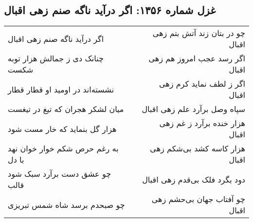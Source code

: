 \begin{center}
\section*{غزل شماره ۱۳۵۶: اگر درآید ناگه صنم زهی اقبال}
\label{sec:1356}
\begin{longtable}{l p{0.5cm} r}
اگر درآید ناگه صنم زهی اقبال
&&
چو در بتان زند آتش بتم زهی اقبال
\\
چنانک دی ز جمالش هزار توبه شکست
&&
اگر رسد عجب امروز هم زهی اقبال
\\
نشسته‌اند در اومید او قطار قطار
&&
اگر ز لطف نماید کرم زهی اقبال
\\
میان لشکر هجران که تیغ در تیغست
&&
سپاه وصل برآرد علم زهی اقبال
\\
هزار گل بنماید که خار مست شود
&&
هزار خنده برآرد ز غم زهی اقبال
\\
به رغم حرص شکم خوار خوان نهد با دل
&&
هزار کاسه کشد بی‌شکم زهی اقبال
\\
چو عشق دست برآرد سبک شود قالب
&&
دود بگرد فلک بی‌قدم زهی اقبال
\\
چو صبحدم برسد شاه شمس تبریزی
&&
چو آفتاب جهان بی‌حشم زهی اقبال
\\
\end{longtable}
\end{center}
